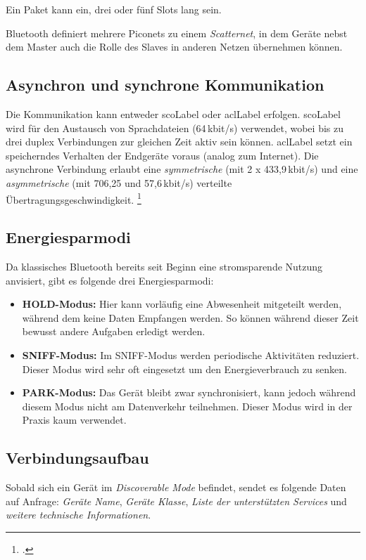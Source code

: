 Ein Paket kann ein, drei oder fünf Slots lang sein.

Bluetooth definiert mehrere Piconets zu einem \textit{Scatternet}, in dem Geräte nebst dem Master auch die Rolle des Slaves in anderen Netzen übernehmen können.

\subsection{Asynchron und synchrone Kommunikation}
Die Kommunikation kann entweder \gls{scoLabel} oder \gls{aclLabel} erfolgen.
\gls{scoLabel} wird für den Austausch von Sprachdateien (64\,kbit/s) verwendet, wobei bis zu drei duplex Verbindungen zur gleichen Zeit aktiv sein können.
\gls{aclLabel} setzt ein speicherndes Verhalten der Endgeräte voraus (analog zum Internet). Die asynchrone Verbindung erlaubt eine \textit{symmetrische} (mit 2 x 433,9\,kbit/s) und eine \textit{asymmetrische} (mit 706,25 und 57,6\,kbit/s) verteilte Übertragungsgeschwindigkeit.
\footcite{Nahfunktechnik_in_Smartphones_FAQ_cio.de_2015-04-24}


\subsection{Energiesparmodi}
\label{subsec:energymode}
Da klassisches Bluetooth bereits seit Beginn eine stromsparende Nutzung anvisiert, gibt es folgende drei Energiesparmodi:
\begin{itemize}
	\item \textbf{HOLD-Modus:} Hier kann vorläufig eine Abwesenheit mitgeteilt werden, während dem keine Daten Empfangen werden. So können während dieser Zeit bewusst andere Aufgaben erledigt werden.
	\item \textbf{SNIFF-Modus:} Im SNIFF-Modus werden periodische Aktivitäten reduziert. Dieser Modus wird sehr oft eingesetzt um den Energieverbrauch zu senken.
	\item \textbf{PARK-Modus:} Das Gerät bleibt zwar synchronisiert, kann jedoch während diesem Modus nicht am Datenverkehr teilnehmen. Dieser Modus wird in der Praxis kaum verwendet.
\end{itemize}


\subsection{Verbindungsaufbau}
\label{sec:connectionSetup}
Sobald sich ein Gerät im \textit{Discoverable Mode} befindet, sendet es folgende Daten auf Anfrage: \textit{Geräte Name}, \textit{Geräte Klasse}, \textit{Liste der unterstützten Services} und \textit{weitere technische Informationen}.

